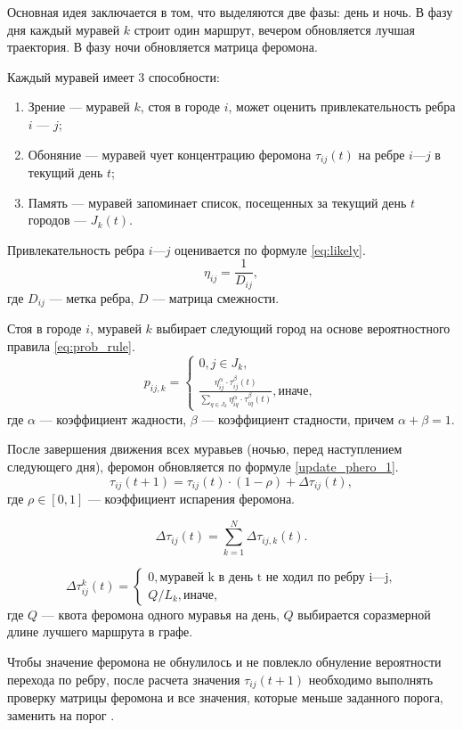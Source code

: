 Основная идея заключается в том, что выделяются две фазы: день и ночь. В фазу дня каждый муравей $k$ строит один маршрут, вечером обновляется лучшая траектория. В фазу ночи обновляется матрица феромона. 

Каждый муравей имеет 3 способности:
\begin{enumerate}
	\item Зрение --- муравей $k$, стоя в городе $i$, может оценить привлекательность ребра $i$ --- $j$;
	\item Обоняние --- муравей чует концентрацию феромона $\tau_{ij}(t)$ на ребре $i$---$j$ в текущий день $t$;
	\item Память --- муравей запоминает список, посещенных за текущий день $t$ городов --- $J_k(t)$.
\end{enumerate}

Привлекательность ребра $i$---$j$ оценивается по формуле \eqref{eq:likely}.
\begin{equation}
	\label{eq:likely}
	\eta_{ij} = \frac{1}{D_{ij}},
\end{equation}
где $D_{ij}$ --- метка ребра, $D$ --- матрица смежности.

Стоя в городе $i$, муравей $k$ выбирает следующий город на основе вероятностного правила \eqref{eq:prob_rule}.
\begin{equation}
	\label{eq:prob_rule}
	p_{ij, k} = \begin{cases}
		0, j \in J_k, \\
		\frac{\eta_{ij}^{\alpha}\cdot\tau_{ij}^{\beta}(t)}{\sum_{q\in J_k} \eta^\alpha_{iq}\cdot\tau^\beta_{iq}(t)}, \text{иначе},
	\end{cases}
\end{equation}
где $\alpha$ --- коэффициент жадности, $\beta$ --- коэффициент стадности, причем $\alpha + \beta = 1$.

После завершения движения всех муравьев (ночью, перед наступлением следующего дня), феромон обновляется по формуле \eqref{update_phero_1}.
\begin{equation}
	\label{update_phero_1}
	\tau_{ij}(t+1) = \tau_{ij}(t)\cdot(1-\rho) + \Delta \tau_{ij}(t),
\end{equation}
где $\rho \in [0, 1]$ --- коэффициент испарения феромона. 

\begin{equation}
	\label{update_phero_2}
	\Delta \tau_{ij}(t) = \sum_{k=1}^N \Delta \tau_{ij, k}(t).
\end{equation}

\begin{equation}
	\label{update_phero_3}
	\Delta\tau^k_{ij}(t) = \begin{cases}
		0, \textrm{муравей k в день t не ходил по ребру i---j,} \\
		Q/L_{k}, \textrm{иначе},
	\end{cases}
\end{equation}
где $Q$ --- квота феромона одного муравья на день, $Q$ выбирается соразмерной длине лучшего маршрута в графе.

Чтобы значение феромона не обнулилось и не повлекло обнуление вероятности перехода по ребру, после расчета значения $\tau_{ij}(t+1)$ необходимо выполнять проверку матрицы феромона и все значения, которые меньше заданного порога, заменить на порог \cite{ants}.

 





